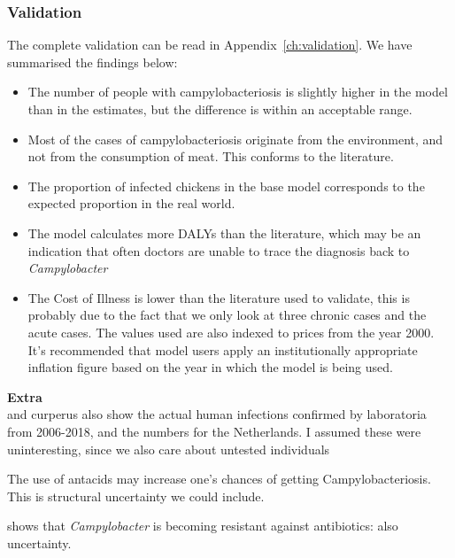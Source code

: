 
\subsubsection{Validation}    


The complete validation can be read in Appendix~\ref{ch:validation}. We have summarised the findings below:

\begin{itemize}
    \item The number of people with campylobacteriosis is slightly higher in the model than in the estimates, but the difference is within an acceptable range.
    \item Most of the cases of campylobacteriosis originate from the environment, and not from the consumption of meat. This conforms to the literature.
    \item The proportion of infected chickens in the base model corresponds to the expected proportion in the real world.
    \item The model calculates more DALYs than the literature, which may be an indication that often doctors are unable to trace the diagnosis back to \textit{Campylobacter}
    \item The Cost of Illness is lower than the literature used to validate, this is probably due to the fact that we only look at three chronic cases and the acute cases. The values used are also indexed to prices from the year 2000. It's recommended that model users apply an institutionally appropriate inflation figure based on the year in which the model is being used.
\end{itemize}

\iffalse
\textbf{Extra}\\
\textcite{vlaanderen_staat_2019} and curperus also show the actual human infections confirmed by laboratoria from 2006-2018, and the numbers for the Netherlands. I assumed these were uninteresting, since we also care about untested individuals

The use of antacids may increase one's chances of getting Campylobacteriosis. This is structural uncertainty we could include.

\textcite{vlaanderen_staat_2019} shows that \textit{Campylobacter} is becoming resistant against antibiotics: also uncertainty.


